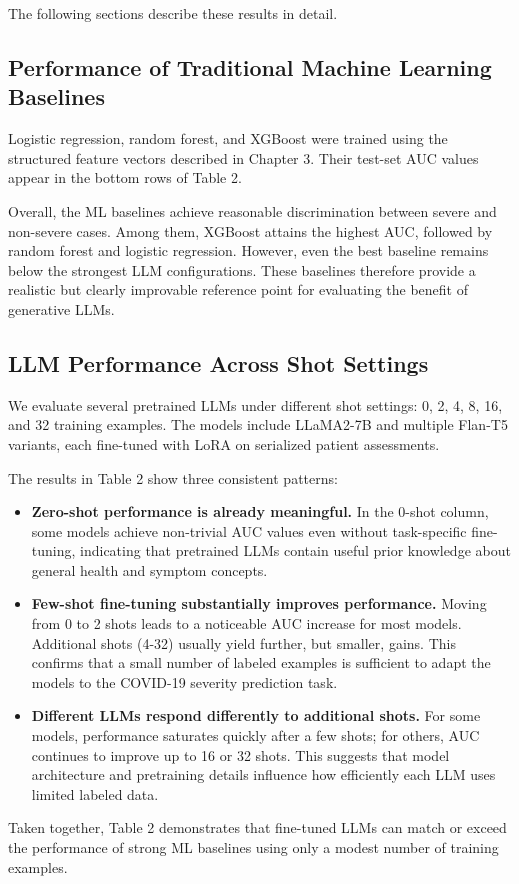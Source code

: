 The following sections describe these results in detail.

\subsection{Performance of Traditional Machine Learning Baselines}
Logistic regression, random forest, and XGBoost were trained using the structured feature vectors described in Chapter 3. Their test-set AUC values appear in the bottom rows of Table 2.

Overall, the ML baselines achieve reasonable discrimination between severe and non-severe cases. Among them, XGBoost attains the highest AUC, followed by random forest and logistic regression. However, even the best baseline remains below the strongest LLM configurations. These baselines therefore provide a realistic but clearly improvable reference point for evaluating the benefit of generative LLMs.

\subsection{LLM Performance Across Shot Settings}
We evaluate several pretrained LLMs under different shot settings: 0, 2, 4, 8, 16, and 32 training examples. The models include LLaMA2-7B and multiple Flan-T5 variants, each fine-tuned with LoRA on serialized patient assessments.

The results in Table 2 show three consistent patterns:
\begin{itemize}
    \item \textbf{Zero-shot performance is already meaningful.} In the 0-shot column, some models achieve non-trivial AUC values even without task-specific fine-tuning, indicating that pretrained LLMs contain useful prior knowledge about general health and symptom concepts.
    \item \textbf{Few-shot fine-tuning substantially improves performance.} Moving from 0 to 2 shots leads to a noticeable AUC increase for most models. Additional shots (4-32) usually yield further, but smaller, gains. This confirms that a small number of labeled examples is sufficient to adapt the models to the COVID-19 severity prediction task.
    \item \textbf{Different LLMs respond differently to additional shots.} For some models, performance saturates quickly after a few shots; for others, AUC continues to improve up to 16 or 32 shots. This suggests that model architecture and pretraining details influence how efficiently each LLM uses limited labeled data.
\end{itemize}
Taken together, Table 2 demonstrates that fine-tuned LLMs can match or exceed the performance of strong ML baselines using only a modest number of training examples.

